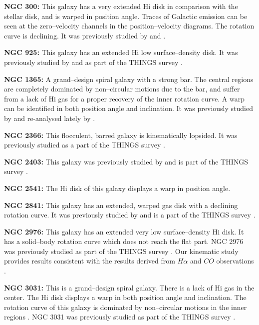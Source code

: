 \documentclass[usenatbib,useAMS]{mnras}
\begin{document}
\textbf{NGC 300:} This galaxy has a very extended H{\sc i} disk in
comparison with the stellar disk, and is warped in position angle. 
Traces of Galactic emission can be seen at the zero--velocity channels
in the position--velocity diagrams.  The rotation curve is declining. 
It was previously studied by \citet{ngc300} and \citet{ngc300a}. 

\textbf{NGC 925:} This galaxy has an extended H{\sc i} low
surface--density disk.  It was previously studied by \citet{ngc925} and
as part of the THINGS survey \citep{deblok08, things}. 

\textbf{NGC 1365:} A grand--design spiral galaxy with a strong bar.  The
central regions are completely dominated by non--circular motions due to
the bar, and suffer from a lack of H{\sc i} gas for a proper recovery of
the inner rotation curve.  A warp can be identified in both position
angle and inclination.  It was previously studied by \citet{1365} and
re-analysed lately by \citet{1365a}. 

\textbf{NGC 2366:} This flocculent, barred galaxy is kinematically
lopsided.  It was previously studied as a part of the THINGS survey
\citep{deblok08, things, oh08}. 

\textbf{NGC 2403:} This galaxy was previously studied by
\citet{begeman87} and is part of the THINGS survey \citep{deblok08,
things}. 

\textbf{NGC 2541:} The H{\sc i} disk of this galaxy displays a warp in
position angle. 

\textbf{NGC 2841:} This galaxy has an extended, warped gas disk with a
declining rotation curve.  It was previously studied by \citet{bosma81,
begeman87} and is a part of the THINGS survey \citep{deblok08, things}. 

\textbf{NGC 2976:} This galaxy has an extended very low surface--density
H{\sc i} disk.  It has a solid--body rotation curve which does not reach
the flat part.  NGC 2976 was previously studied as part of the THINGS
survey \citep{deblok08, things}.  Our kinematic study provides results
consistent with the results derived from $H\alpha$ and $CO$ observations
\citep{simon03}. 
 
\textbf{NGC 3031:} This is a grand--design spiral galaxy.  There is a
lack of H{\sc i} gas in the center.  The H{\sc i} disk displays a warp
in both position angle and inclination.  The rotation curve of this
galaxy is dominated by non--circular motions in the inner regions
\citep{visser80} .  NGC 3031 was previously studied as part of the
THINGS survey \citep{deblok08, things}. 
 
\end{document}
